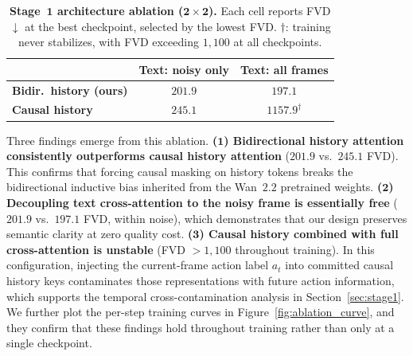 \begin{table}[h]
  \caption{\textbf{Stage~$\mathbf{1}$ architecture ablation ($\mathbf{2\times 2}$).} Each cell reports FVD$\downarrow$ at the best checkpoint, selected by the lowest FVD. $\dagger$: training never stabilizes, with FVD exceeding $1{,}100$ at all checkpoints.}
  \label{tab:ablation}
  \centering
  \setlength{\tabcolsep}{12pt}
  \begin{tabular}{lcc}
    \toprule
    & \textbf{Text: noisy only} & \textbf{Text: all frames} \\
    \midrule
    \textbf{Bidir.\ history (ours)} & $\mathbf{201.9}$ & $197.1$ \\
    \textbf{Causal history}         & $245.1$          & $1157.9^\dagger$ \\
    \bottomrule
  \end{tabular}
\end{table}

Three findings emerge from this ablation.
\textbf{($\mathbf{1}$) Bidirectional history attention consistently outperforms causal history attention} ($201.9$ vs.\ $245.1$ FVD). This confirms that forcing causal masking on history tokens breaks the bidirectional inductive bias inherited from the Wan~$2.2$ pretrained weights.
\textbf{($\mathbf{2}$) Decoupling text cross-attention to the noisy frame is essentially free} ($201.9$ vs.\ $197.1$ FVD, within noise), which demonstrates that our design preserves semantic clarity at zero quality cost.
\textbf{($\mathbf{3}$) Causal history combined with full cross-attention is unstable} (FVD $>1{,}100$ throughout training). In this configuration, injecting the current-frame action label $a_t$ into committed causal history keys contaminates those representations with future action information, which supports the temporal cross-contamination analysis in Section~\ref{sec:stage1}.
We further plot the per-step training curves in Figure~\ref{fig:ablation_curve}, and they confirm that these findings hold throughout training rather than only at a single checkpoint.

